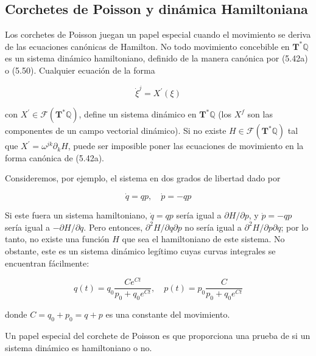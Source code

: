 \subsection{Corchetes de Poisson y dinámica Hamiltoniana}

Los corchetes de Poisson juegan un papel especial cuando el movimiento se deriva de las ecuaciones canónicas de Hamilton. No todo movimiento concebible en \(\mathbf{T}^{*} \mathbb{Q}\) es un sistema dinámico hamiltoniano, definido de la manera canónica por (5.42a) o (5.50). Cualquier ecuación de la forma

\[
\dot{\xi}^{j} = X^{\prime}(\xi) \tag{5.60}
\]

con \( X^{\prime} \in \mathcal{F}\left(\mathbf{T}^{*} \mathbb{Q}\right) \), define un sistema dinámico en \(\mathbf{T}^{*} \mathbb{Q}\) (los \( X^{f} \) son las componentes de un campo vectorial dinámico). Si no existe \( H \in \mathcal{F}\left(\mathbf{T}^{*} \mathbb{Q}\right) \) tal que \( X^{\prime} = \omega^{j k} \partial_{k} H \), puede ser imposible poner las ecuaciones de movimiento en la forma canónica de (5.42a).

\begin{example}
  Consideremos, por ejemplo, el sistema en dos grados de libertad dado por

\[
\dot{q} = q p, \quad \dot{p} = -q p \tag{5.61}
\]

Si este fuera un sistema hamiltoniano, \(\dot{q} = q p\) sería igual a \(\partial H / \partial p\), y \(\dot{p} = -q p\) sería igual a \(-\partial H / \partial q\). Pero entonces, \(\partial^{2} H / \partial q \partial p\) no sería igual a \(\partial^{2} H / \partial p \partial q\); por lo tanto, no existe una función \(H\) que sea el hamiltoniano de este sistema. No obstante, este es un sistema dinámico legítimo cuyas curvas integrales se encuentran fácilmente:

\[
q(t) = q_{0} \frac{C e^{C t}}{p_{0} + q_{0} e^{C t}}, \quad p(t) = p_{0} \frac{C}{p_{0} + q_{0} e^{C t}}
\]

donde \(C = q_{0} + p_{0} = q + p\) es una constante del movimiento.
\end{example}

Un papel especial del corchete de Poisson es que proporciona una prueba de si un sistema dinámico es hamiltoniano o no. 

